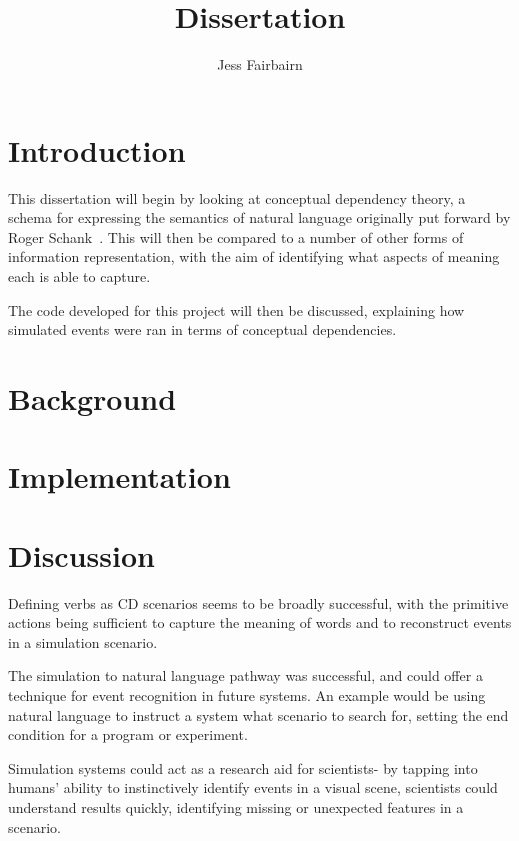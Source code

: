\documentclass{article}
\author{Jess Fairbairn}
\title{Dissertation}
\begin{document}
    \maketitle
    \tableofcontents
    \section{Introduction}
    This dissertation will begin by looking at conceptual dependency theory, a schema for expressing the semantics of natural language originally put forward by Roger Schank~\cite{SCHANK1972552}. This will then be compared to a number of other forms of information representation, with the aim of identifying what aspects of meaning each is able to capture.

    The code developed for this project will then be discussed, explaining how simulated events were ran in terms of conceptual dependencies. 

    \section{Background}
    
    

    \section{Implementation}
    
    


    \section{Discussion}
    Defining verbs as CD scenarios seems to be broadly successful, with the primitive actions being sufficient to capture the meaning of words and to reconstruct events in a simulation scenario.

    The simulation to natural language pathway was successful, and could offer a technique for event recognition in future systems. An example would be using natural language to instruct a system what scenario to search for, setting the end condition for a program or experiment.

    Simulation systems could act as a research aid for scientists- by tapping into humans' ability to instinctively identify events in a visual scene, scientists could understand results quickly, identifying missing or unexpected features in a scenario.
\end{document}
